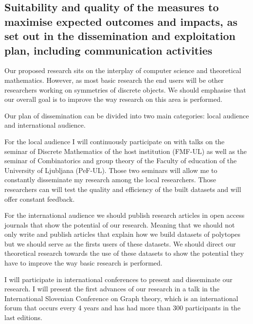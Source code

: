 \subsection{Suitability and quality of the measures to maximise expected outcomes and impacts, as set out in the dissemination and exploitation plan, including communication activities}
\label{sec:suitability}



Our proposed research sits on the interplay of computer science and theoretical mathematics.
However, as most basic research the end users will be other researchers working on symmetries of discrete objects.
We should emphasise that our overall goal is to improve the way research on this area is performed.

Our plan of dissemination can be divided into two main categories: local audience and international audience.

For the local audience I will continuously participate on with talks on the seminar of Discrete Mathematics of the host institution (FMF-UL) as well as the seminar of Combinatorics and group theory of the Faculty of education of the University of Ljubljana (PeF-UL).
Those two seminars will allow me to constantly disseminate my research among the local researchers.
Those researchers can will test the quality and efficiency of the built datasets and will offer constant feedback.

For the international audience we should publish research articles in open access journals that show the potential of our research.
Meaning that we should not only write and publish articles that explain how we build datasets of polytopes but we should serve as the firsts users of these datasets.
We should direct our theoretical research towards the use of these datasets to show the potential they have to improve the way basic research is performed.

I will participate in international conferences to present and disseminate our research. I will present the first advances of our research in a talk in the International Slovenian Conference on Graph theory, which is an international forum that occurs every 4 years and has had more than 300 participants in the last editions.

